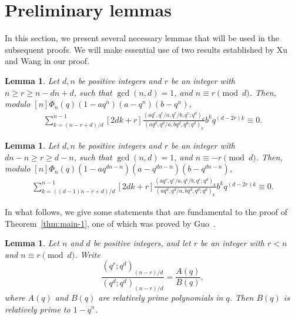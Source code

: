 \documentclass[12pt]{article}
\newtheorem{lem}[thm]{Lemma}
\numberwithin{equation}{section}
\begin{document}
\section{Preliminary lemmas}
In this section, we present several necessary lemmas that will be used in the subsequent proofs.
We will make essential use of two results established by Xu and Wang \cite{XW} in our proof. 
\begin{lem}
    Let $d,n$ be positive integers and $r$ be an integer with $n\geqslant r\geqslant n-dn+d$, such that $\gcd(n,d)=1$, 
    and $n\equiv r \pmod{d}$. Then, modulo $[n]\Phi_n(q)(1-aq^n)(a-q^n)(b-q^n)$,
    \begin{align*}
        \sum_{k=(n-r+d)/d}^{n-1}[2dk+r]\frac{(aq^r,q^r/a,q^r/b,q^r;q^d)_k}{(aq^d,q^d/a,bq^d,q^d;q^d)_k}b^kq^{(d-2r)k}\equiv0.
    \end{align*}
\end{lem}
\begin{lem}
    Let $d,n$ be positive integers and $r$ be an integer with $dn-n\geqslant r\geqslant d-n$, such that $\gcd(n,d)=1$, 
    and $n\equiv -r \pmod{d}$. Then, modulo $[n]\Phi_n(q)(1-aq^{dn-n})(a-q^{dn-n})(b-q^{dn-n})$,
    \begin{align*}
        \sum_{k=((d-1)n-r+d)/d}^{n-1}[2dk+r]\frac{(aq^r,q^r/a,q^r/b,q^r;q^d)_k}{(aq^d,q^d/a,bq^d,q^d;q^d)_k}b^kq^{(d-2r)k}\equiv0.
    \end{align*}
\end{lem}
In what follows, we give some statements that are fundamental to the proof of Theorem~\ref{thm:main-1},
one of which was proved by Guo~\cite[Lemma~2.1]{Guo-qE2F2}.
\begin{lem}\label{lem:n-coprime}
Let $n$ and $d$ be positive integers, and let $r$ be an integer with $r<n$ and $n\equiv r\pmod{d}$. Write
\[\frac{{(q^r;q^d)}_{(n-r)/d}}{{(q^d;q^d)}_{(n-r)/d}}=\frac{A(q)}{B(q)},\]
where $A(q)$ and $B(q)$ are relatively prime polynomials in $q$. Then $B(q)$ is relatively prime to $1-q^n$.
\end{lem}
\end{document}
